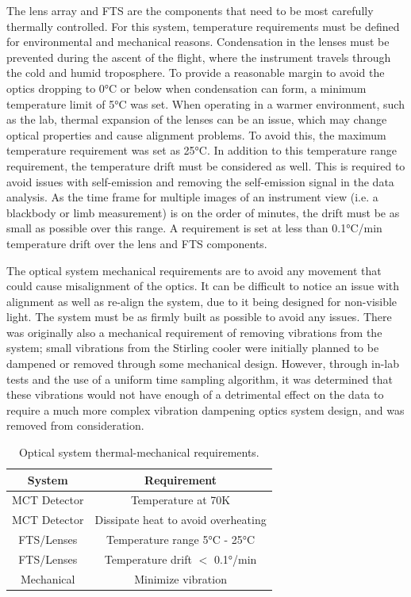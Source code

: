 The lens array and FTS are the components that need to be most carefully thermally controlled. For this system, temperature requirements must be defined for environmental and mechanical reasons. Condensation in the lenses must be prevented during the ascent of the flight, where the instrument travels through the cold and humid troposphere. To provide a reasonable margin to avoid the optics dropping to 0°C or below when condensation can form, a minimum temperature limit of 5°C was set. When operating in a warmer environment, such as the lab, thermal expansion of the lenses can be an issue, which may change optical properties and cause alignment problems. To avoid this, the maximum temperature requirement was set as 25°C. In addition to this temperature range requirement, the temperature drift must be considered as well. This is required to avoid issues with self-emission and removing the self-emission signal in the data analysis. As the time frame for multiple images of an instrument view (i.e. a blackbody or limb measurement) is on the order of minutes, the drift must be as small as possible over this range. A requirement is set at less than 0.1°C/min temperature drift over the lens and FTS components. 

The optical system mechanical requirements are to avoid any movement that could cause misalignment of the optics. It can be difficult to notice an issue with alignment as well as re-align the system, due to it being designed for non-visible light. The system must be as firmly built as possible to avoid any issues. There was originally also a mechanical requirement of removing vibrations from the system; small vibrations from the Stirling cooler were initially planned to be dampened or removed through some mechanical design. However, through in-lab tests and the use of a uniform time sampling algorithm, it was determined that these vibrations would not have enough of a detrimental effect on the data to require a much more complex vibration dampening optics system design, and was removed from consideration.

\begin{table}[h]
\begin{center}
\begin{tabular}{ |c|c| }
 \hline
 \rowcolor{lightgray}
 System & Requirement\\
  \hline
  \hline
  MCT Detector & Temperature at 70K\\
 \hline
  MCT Detector & Dissipate heat to avoid overheating\\
 \hline
 FTS/Lenses & Temperature range 5°C - 25°C\\
 \hline
 FTS/Lenses & Temperature drift $<$ 0.1°/min\\
 \hline
 Mechanical & Minimize vibration\\
 \hline
\end{tabular}
\end{center}
\caption{Optical system thermal-mechanical requirements.}
 \label{optics_req_table}
\end{table}

